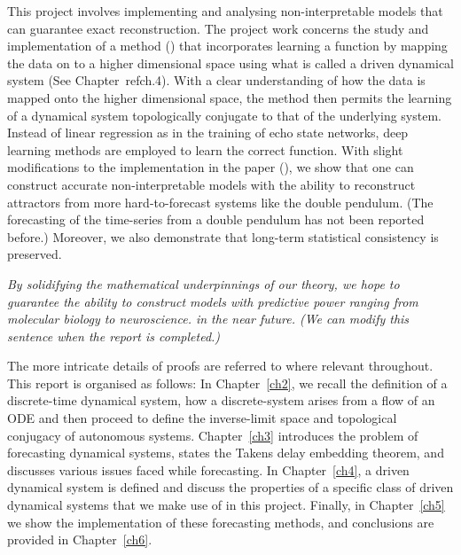 This project involves implementing and analysing non-interpretable models that can guarantee exact reconstruction. 
The project work concerns the study and implementation of a method (\cite{manjunath2021universal}) that incorporates learning a function by mapping the data on to a higher dimensional space using what is called a driven dynamical system (See Chapter~ref{ch.4}). With a clear understanding of how the data is mapped onto the higher dimensional space, the method then permits the learning of a dynamical system topologically conjugate to that of the underlying system. Instead of linear regression as in the training of echo state networks, deep learning methods are employed to learn the correct function. With slight modifications to the implementation in the paper (\cite{manjunath2021universal}), we show that one can construct accurate non-interpretable models with the ability to reconstruct attractors from more hard-to-forecast systems like the double pendulum. (The forecasting of the time-series from a double pendulum has not been reported before.) Moreover, we also demonstrate that long-term statistical consistency is preserved.

\emph{By solidifying the mathematical underpinnings of our theory, we hope to guarantee the ability to construct models with predictive power ranging from molecular biology to neuroscience. in the near future. (We can modify this sentence when the report is completed.)}

The more intricate details of proofs are referred to where relevant throughout. This report is organised as follows: 
\newline In Chapter~\ref{ch2}, we recall the definition of a discrete-time dynamical system, how a discrete-system arises from a flow of an ODE and then proceed to define the inverse-limit space and topological conjugacy of autonomous systems. 
\newline Chapter~\ref{ch3} introduces the problem of forecasting dynamical systems, states the Takens delay embedding theorem, and discusses various issues faced while forecasting. 
\newline In Chapter~\ref{ch4}, a driven dynamical system is defined and discuss the properties of a specific class of driven dynamical systems that we make use of in this project.
\newline Finally, in Chapter~\ref{ch5} we show the implementation of these forecasting methods, and conclusions are provided in Chapter~\ref{ch6}.


